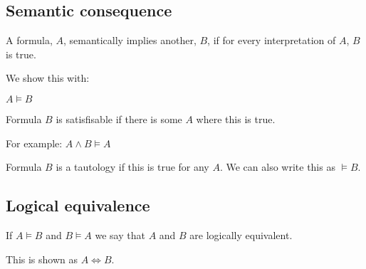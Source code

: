 \subsection{Semantic consequence}

A formula, \(A\), semantically implies another, \(B\), if for every interpretation of \(A\), \(B\) is true.

We show this with:

\(A\vDash B\)

Formula \(B\) is satisfisable if there is some \(A\) where this is true.

For example:
\(A\land B \vDash A\)

Formula \(B\) is a tautology if this is true for any \(A\). We can also write this as \(\vDash B\).

\subsection{Logical equivalence}

If \(A\vDash B\) and \(B\vDash A\) we say that \(A\) and \(B\) are logically equivalent.

This is shown as \(A \Leftrightarrow B\).
